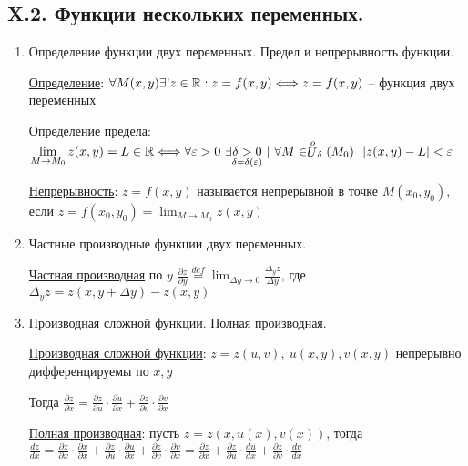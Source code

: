 \documentclass[12pt]{article}
\begin{document}
    \subsection{X.2. Функции нескольких переменных.}

    \begin{enumerate}
        \item Определение функции двух переменных. Предел и непрерывность функции.

        \hyperlink{functionoftwovariables}{Определение}: $\forall M(x, y) \exists! z \in \mathbb{R} : z = f(x, y) \Longleftrightarrow z = f(x, y)$ -- функция двух переменных

        \hyperlink{limitoffunctionoftwovariables}{Определение предела}: $\displaystyle \lim_{M \to M_0} z(x, y) = L \in \mathbb{R} \Longleftrightarrow \forall \varepsilon > 0 \ \exists \underset{\delta = \delta(\varepsilon)}{\delta > 0} \ | \ \forall M \in \stackrel{o}{U}_\delta(M_0) \ \ |z(x, y) - L| < \varepsilon$

        \hyperlink{continuityoffunctionoftwovariables}{Непрерывность}: $z = f(x, y)$ называется непрерывной в точке $M(x_0, y_0)$, если $z = f(x_0, y_0) = \lim_{M \to M_0} z(x, y)$

        \item Частные производные функции двух переменных.

        \hyperlink{partialderivativeoffunctionoftwovariables}{Частная производная} по $y$ $\displaystyle \frac{\partial z}{\partial y} \stackrel{def}{=} \lim_{\Delta y \to 0} \frac{\Delta_y z}{\Delta y}$,
        где $\Delta_y z = z(x, y + \Delta y) - z(x, y)$

        \item Производная сложной функции. Полная производная.

        \hyperlink{derivativeofcomplexfunctionoftwovariables}{Производная сложной функции}: $\displaystyle z = z(u, v), \ u(x, y), v(x, y)$ непрерывно дифференцируемы по $\displaystyle x, y$

        Тогда $\displaystyle \frac{\partial z}{\partial x} = \frac{\partial z}{\partial u} \cdot \frac{\partial u}{\partial x} + \frac{\partial z}{\partial v} \cdot \frac{\partial v}{\partial x}$

        \hyperlink{completedifferentialoffunctionoftwovariables}{Полная производная}: пусть $\displaystyle z = z(x, u(x), v(x))$,
        тогда $\displaystyle \frac{dz}{dx} = \frac{\partial z}{\partial x} \cdot \frac{\partial x}{\partial x} + \frac{\partial z}{\partial u} \cdot \frac{\partial u}{\partial x} + \frac{\partial z}{\partial v} \cdot \frac{\partial v}{\partial x} =
        \frac{\partial z}{\partial x} + \frac{\partial z}{\partial u} \cdot \frac{du}{dx} + \frac{\partial z}{\partial v} \cdot \frac{dv}{dx}$


\end{enumerate}
\end{document}
